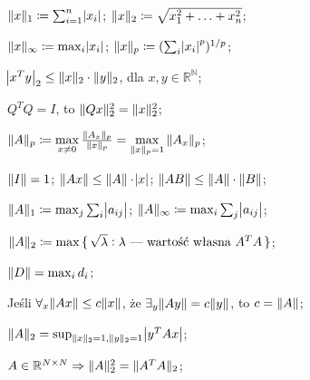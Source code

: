 

\entry
$\|x\|_1 \coloneqq \sum^n_{i=1}\abs{x_i}$;
\entry
$\|x\|_2 \coloneqq \sqrt{x_1^2+\ldots + x_n^2}$;

\entry
$\|x\|_\infty \coloneqq \max_{i}\abs{x_i}$;
\entry
$\|x\|_p \coloneqq (\sum_i\abs{x_i}^p)^{1/p}$;

\entry
$\abs{x^Ty}_2 \leq \|x\|_2\cdot\|y\|_2$, dla $x,y\in\mathbb{R^N}$;

\entry
$Q^TQ=I$, to $\|Qx\|^2_2=\|x\|^2_2$;


\entry
$\|A\|_p \coloneqq \max\limits_{x\neq 0} \frac{\|A_x\|_p}{\|x\|_p} = \max\limits_{\|x\|_p = 1} \|A_x\|_p$;

\entry
$\|I\| = 1$;
\entry
$\|Ax\| \leq \|A\| \cdot \abs{x}$;
\entry
$\|AB\| \leq \|A\| \cdot \|B\|$;

\entry
$\|A\|_1 \coloneqq \max_j\sum_i\abs{a_{ij}}$;
\entry
$\|A\|_\infty \coloneqq \max_i\sum_j\abs{a_{ij}}$;

\entry
$\|A\|_2 \coloneqq \max\set{\sqrt{\lambda} : \lambda\text{ --- wartość własna } A^TA}$;

\entry
$\|D\| = \max_i d_i$;

\entry
Jeśli $\forall_{x} \|Ax\|\leq c\|x\|$, że $\exists_y \|Ay\| = c\|y\|$, to $c=\|A\|$;

\entry
$\|A\|_2 = \sup_{\|x\|_2=1, \|y\|_2=1}\abs{y^TAx}$;

\entry
$A\in\mathbb{R}^{N\times N} \Rightarrow \|A\|^2_2=\|A^TA\|_2$;




